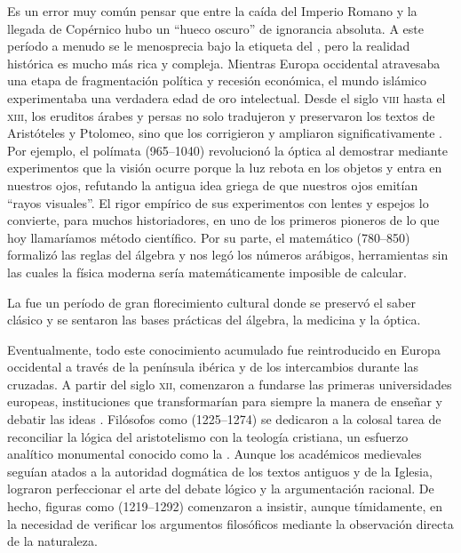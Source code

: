 Es un error muy común pensar que entre la caída del Imperio Romano y la llegada de Copérnico hubo un “hueco oscuro” de ignorancia absoluta.
A este período a menudo se le menosprecia bajo la etiqueta del , pero la realidad histórica es mucho más rica y compleja.
Mientras Europa occidental atravesaba una etapa de fragmentación política y recesión económica, el mundo islámico experimentaba una verdadera edad de oro intelectual.
Desde el siglo \textsc{viii} hasta el \textsc{xiii}, los eruditos árabes y persas no solo tradujeron y preservaron los textos de Aristóteles y Ptolomeo, sino que los corrigieron y ampliaron significativamente \cite{alkhalili2011house}.
Por ejemplo, el polímata  (965--1040) revolucionó la óptica al demostrar mediante experimentos que la visión ocurre porque la luz rebota en los objetos y entra en nuestros ojos, refutando la antigua idea griega de que nuestros ojos emitían “rayos visuales”.
El rigor empírico de sus experimentos con lentes y espejos lo convierte, para muchos historiadores, en uno de los primeros pioneros de lo que hoy llamaríamos método científico.
Por su parte, el matemático  (780--850) formalizó las reglas del álgebra y nos legó los números arábigos, herramientas sin las cuales la física moderna sería matemáticamente imposible de calcular.

\begin{remember}
	\label{rem:edad-oro-islamica}
	La  fue un período de gran florecimiento cultural donde se preservó el saber clásico y se sentaron las bases prácticas del álgebra, la medicina y la óptica.
\end{remember}

Eventualmente, todo este conocimiento acumulado fue reintroducido en Europa occidental a través de la península ibérica y de los intercambios durante las cruzadas.
A partir del siglo \textsc{xii}, comenzaron a fundarse las primeras universidades europeas, instituciones que transformarían para siempre la manera de enseñar y debatir las ideas \cite{grant1996foundations}.
Filósofos como  (1225--1274) se dedicaron a la colosal tarea de reconciliar la lógica del aristotelismo con la teología cristiana, un esfuerzo analítico monumental conocido como la .
Aunque los académicos medievales seguían atados a la autoridad dogmática de los textos antiguos y de la Iglesia, lograron perfeccionar el arte del debate lógico y la argumentación racional.
De hecho, figuras como  (1219--1292) comenzaron a insistir, aunque tímidamente, en la necesidad de verificar los argumentos filosóficos mediante la observación directa de la naturaleza.

